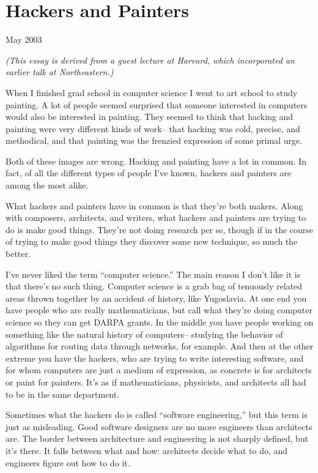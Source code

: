 \chapter{Hackers and Painters}

May 2003

\emph{(This essay is derived from a guest lecture at Harvard, which
incorporated an earlier talk at Northeastern.)}

When I finished grad school in computer science I went to art school to
study painting. A lot of people seemed surprised that someone interested
in computers would also be interested in painting. They seemed to think
that hacking and painting were very different kinds of work-- that
hacking was cold, precise, and methodical, and that painting was the
frenzied expression of some primal urge.

Both of these images are wrong. Hacking and painting have a lot in
common. In fact, of all the different types of people I've known,
hackers and painters are among the most alike.

What hackers and painters have in common is that they're both makers.
Along with composers, architects, and writers, what hackers and painters
are trying to do is make good things. They're not doing research per se,
though if in the course of trying to make good things they discover some
new technique, so much the better.

I've never liked the term ``computer science.'' The main reason I don't
like it is that there's no such thing. Computer science is a grab bag of
tenuously related areas thrown together by an accident of history, like
Yugoslavia. At one end you have people who are really mathematicians,
but call what they're doing computer science so they can get DARPA
grants. In the middle you have people working on something like the
natural history of computers-- studying the behavior of algorithms for
routing data through networks, for example. And then at the other
extreme you have the hackers, who are trying to write interesting
software, and for whom computers are just a medium of expression, as
concrete is for architects or paint for painters. It's as if
mathematicians, physicists, and architects all had to be in the same
department.

Sometimes what the hackers do is called ``software engineering,'' but
this term is just as misleading. Good software designers are no more
engineers than architects are. The border between architecture and
engineering is not sharply defined, but it's there. It falls between
what and how: architects decide what to do, and engineers figure out how
to do it.

